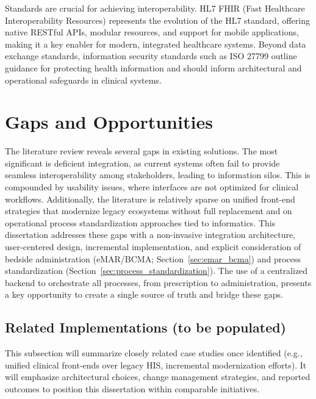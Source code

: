 Standards are crucial for achieving interoperability. HL7 FHIR (Fast Healthcare Interoperability Resources) represents the evolution of the HL7 standard, offering native RESTful APIs, modular resources, and support for mobile applications, making it a key enabler for modern, integrated healthcare systems. Beyond data exchange standards, information security standards such as ISO 27799 outline guidance for protecting health information and should inform architectural and operational safeguards in clinical systems.

\section{Gaps and Opportunities}

The literature review reveals several gaps in existing solutions. The most significant is deficient integration, as current systems often fail to provide seamless interoperability among stakeholders, leading to information silos. This is compounded by usability issues, where interfaces are not optimized for clinical workflows. Additionally, the literature is relatively sparse on unified front-end strategies that modernize legacy ecosystems without full replacement and on operational process standardization approaches tied to informatics. This dissertation addresses these gaps with a non-invasive integration architecture, user-centered design, incremental implementation, and explicit consideration of bedside administration (eMAR/BCMA; Section~\ref{sec:emar_bcma}) and process standardization (Section~\ref{sec:process_standardization}). The use of a centralized backend to orchestrate all processes, from prescription to administration, presents a key opportunity to create a single source of truth and bridge these gaps.

\subsection{Related Implementations (to be populated)}
This subsection will summarize closely related case studies once identified (e.g., unified clinical front-ends over legacy HIS, incremental modernization efforts). It will emphasize architectural choices, change management strategies, and reported outcomes to position this dissertation within comparable initiatives.

